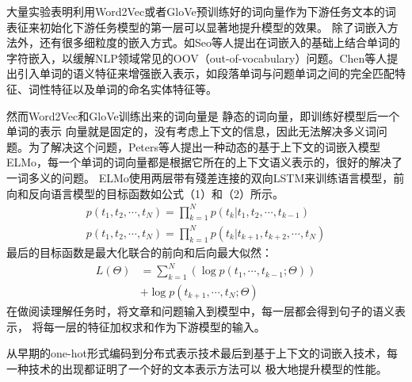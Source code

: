 大量实验表明利用Word2Vec或者GloVe预训练好的词向量作为下游任务文本的词表征来初始化下游任务模型的第一层可以显著地提升模型的效果。
除了词嵌入方法外，还有很多细粒度的嵌入方式。如Seo等人提出在词嵌入的基础上结合单词的字符嵌入，以缓解NLP领域常见的OOV（out-of-vocabulary）问题。Chen等人提出引入单词的语义特征来增强嵌入表示，如段落单词与问题单词之间的完全匹配特征、词性特征以及单词的命名实体特征等。

然而Word2Vec和GloVe训练出来的词向量是
静态的词向量，即训练好模型后一个单词的表示
向量就是固定的，没有考虑上下文的信息，因此无法解决多义词问题。为了解决这个问题，Peters等人提出一种动态的基于上下文的词嵌入模型ELMo，每一个单词的词向量都是根据它所在的上下文语义表示的，很好的解决了一词多义的问题。
ELMo使用两层带有殘差连接的双向LSTM来训练语言模型，前向和反向语言模型的目标函数如公式（1）和（2）所示。
\begin{gather}
p(t_1,t_2,\cdots,t_N)=\prod_{k=1}^{N}p(t_k|t_1,t_2,\cdots,t_{k-1})\\
p(t_1,t_2,\cdots,t_N)=\prod_{k=1}^{N}p(t_k|t_{k+1},t_{k+2},\cdots,t_{N})
\end{gather}
最后的目标函数是最大化联合的前向和后向最大似然：
\begin{equation}
\begin{split}
L(\Theta)&=\sum_{k=1}^{N}(\log p(t_1,\cdots,t_{k-1};\Theta)) \\
&+\log p(t_{k+1},\cdots,t_N;\Theta)
\end{split}
\end{equation}
在做阅读理解任务时，将文章和问题输入到模型中，每一层都会得到句子的语义表示，
将每一层的特征加权求和作为下游模型的输入。


从早期的one-hot形式编码到分布式表示技术最后到基于上下文的词嵌入技术，每一种技术的出现都证明了一个好的文本表示方法可以
极大地提升模型的性能。
